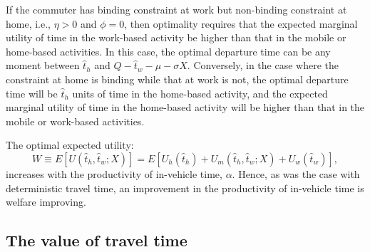 \documentclass[12pt,a4paper,british]{article}
\begin{document}
If the commuter has binding constraint at work but non-binding constraint at home, i.e., $\eta>0$ and $\phi=0$, then optimality requires that the expected marginal utility of time in the work-based activity be higher than that in the mobile or home-based activities. In this case, the optimal departure time can be any moment between $\hat{t}_{h}$ and $Q-\hat{t}_{w}-\mu-\sigma X$. Conversely, in the case where the constraint at home is binding while that at work is not, the optimal departure time will be $\hat{t}_{h}$ units of time in the home-based activity, and the expected marginal utility of time in the home-based activity will be higher than that in the mobile or work-based activities.

The optimal expected utility:
\begin{equation*}
W\equiv E\left[U\left(\hat{t}_{h},\hat{t}_{w}; X\right)\right] = E\left[ U_{h}\left(\hat{t}_{h} \right) + U_{m}\left(\hat{t}_{h},\hat{t}_{w}; X\right) + U_{w}\left(\hat{t}_{w}\right)\right],
\end{equation*}
increases with the productivity of in-vehicle time, $\alpha$. Hence, as was the case with deterministic travel time, an improvement in the productivity of in-vehicle time is welfare improving.



\subsection*{The value of travel time}
\end{document}
